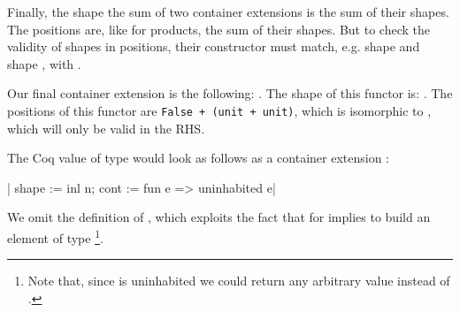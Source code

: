 \documentclass[ a4paper, UKenglish, cleveref, autoref, thm-restate]{lipics-v2021}
\begin{document}
Finally, the shape the sum of two container extensions is the sum of their
shapes. The positions are, like for products, the sum of their shapes. But to
check the validity of shapes in positions, their constructor must match, e.g.
shape  and shape , with
.

Our final container extension is the following:
.
The shape of this functor is:
. The positions of this functor
are \texttt{False + (unit + unit)}, which is isomorphic
to , which will only be valid in the RHS.

The Coq value  of type
 would look as follows as a container
extension
:
\begin{coqcode}
{| shape := inl n; cont := fun e => uninhabited e|}
\end{coqcode}
We omit the definition of , which exploits the
fact that  for  implies
 to build an element of type %
\footnote{Note that, since  is uninhabited we could return
any arbitrary value instead of .}.
\end{document}
